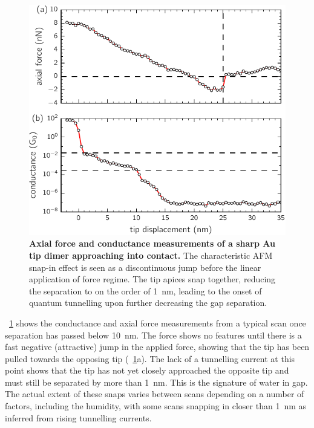 \documentclass[a4paper]{article}
\begin{document}
\begin{figure}[bt]
\centering
\includegraphics{figures/tip_scanning_properties}
\caption[Axial force and conductance measurements of a sharp Au tip dimer approaching into contact]{\textbf{Axial force and conductance measurements of a sharp Au tip dimer approaching into contact.} The characteristic AFM snap-in effect is seen as a discontinuous jump before the linear application of force regime. The tip apices snap together, reducing the separation to on the order of \SI{1}{nm}, leading to the onset of quantum tunnelling upon further decreasing the gap separation.}
\label{fig:tip_scan_props}
\end{figure}

\figurename~\ref{fig:tip_scan_props} shows the conductance and axial force measurements from a typical scan once separation has passed below \SI{10}{nm}. The force shows no features until there is a fast negative (attractive) jump in the applied force, showing that the tip has been pulled towards the opposing tip (\figurename~\ref{fig:tip_scan_props}a). The lack of a tunnelling current at this point shows that the tip has not yet closely approached the opposite tip and must still be separated by more than \SI{1}{nm}. This is the signature of water in gap. The actual extent of these snaps varies between scans depending on a number of factors, including the humidity, with some scans snapping in closer than \SI{1}{nm} as inferred from rising tunnelling currents. %
\end{document}
